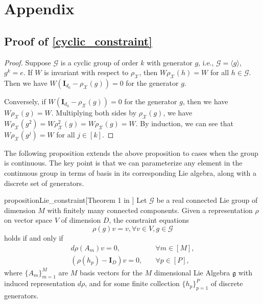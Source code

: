 \documentclass{article}
\newcommand{\G}{\mathcal{G}}
\theoremstyle{plain}
\theoremstyle{definition}
\theoremstyle{remark}
\theoremstyle{remark}
\begin{document}
\section{Appendix}
\subsection{Proof of \autoref{cyclic_constraint}} 
\label{app:proof-prop1}
\cyclicconstraint*
\begin{proof}
  Suppose $\mathcal{G}$ is a cyclic group of order $k$ with generator $g$, i.e., $\mathcal{G} = \langle g\rangle$, $g^k = e$. If $W$ is invariant with respect to $\rho_{\mathcal{X}}$, then $W \rho_{\mathcal{X}}(h) = W$ for all $h \in \mathcal{G}$. Then we have $W(\mathbf{I}_{d_0}-\rho_{\mathcal{X}}(g)) = 0$ for the generator $g$.

  Conversely, if $W(\mathbf{I}_{d_0}-\rho_{\mathcal{X}}(g)) = 0$ for the generator $g$, then we have $W \rho_{\mathcal{X}}(g) = W$. Multiplying both sides by $\rho_{\mathcal{X}}(g)$, we have $W \rho_{\mathcal{X}}(g^2) = W \rho^2_{\mathcal{X}}(g) = W\rho_{\mathcal{X}}(g) = W$. By induction, we can see that $W \rho_{\mathcal{X}}(g^j) = W$ for all $j \in [k]$.
\end{proof}

The following proposition extends the above proposition to cases when the group is continuous. 
The key point is that we can parameterize any element in the continuous group in terms of basis in its corresponding Lie algebra, along with a discrete set of generators.

\begin{restatable}{proposition}{Lie_constraint}[Theorem 1 in \citet{finzi_2021}]
  \label{Lie_constraint}
  Let $\G$ be a real connected Lie group of dimension $M$ with finitely many connected components. Given a representation $\rho$ on vector space $V$ of dimension $D$, the constraint equations 
  \begin{equation}
    \rho(g)v = v, \forall v \in V, g \in \G
  \end{equation}
  holds if and only if 
  \begin{align}
      d \rho(A_m)v = 0, &\quad \forall m \in [M], \\
      (\rho(h_p)-\mathbf{I}_{D})v = 0, &\quad \forall p \in [P],
  \end{align}
  where $\{A_m\}_{m=1}^{M}$ are $M$ basis vectors for the $M$ dimensional Lie Algebra $\mathfrak{g}$ with induced representation $d\rho$, and for some finite collection $\{h_p\}_{p=1}^{P}$ of discrete generators.
\end{restatable}
\end{document}
